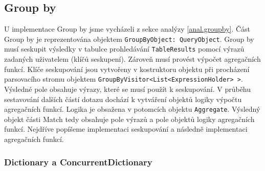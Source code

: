 \subsection{Group by}

U implementace Group by jsme vycházeli z sekce analýzy \ref{anal.groupby}.
Část Group by je reprezentována objektem \texttt{GroupByObject: QueryObject}.
Group by musí seskupit výsledky v tabulce prohledávání \texttt{TableResults} pomocí výrazů zadaných uživatelem (klíčů seskupení).
Zároveň musí provést výpočet agregačních funkcí.
Klíče seskupování jsou vytvořeny v kostruktoru objektu při procházení parsovacího stromu objektem \texttt{GroupByVisitor<List<ExpressionHolder> >}.
Výsledné pole obsahuje výrazy, které se musí použít k seskupování.
V průběhu sestavování dalších částí dotazu dochází k vytváření objektů logiky výpočtu agregačních funkcí.
Logika je obsažena v potomcích objektu \texttt{Aggregate}.
Výsledný objekt části Match tedy obsahuje pole výrazů a pole objektů logiky agregačních funkcí.
Nejdříve popíšeme implementaci seskupování a následně implementaci agregačních funkcí.

\subsubsection{Dictionary a ConcurrentDictionary}

